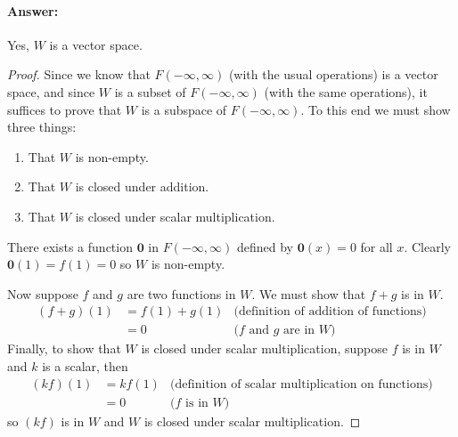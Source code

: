 \documentclass[12pt]{article}
\begin{document}
\begin{enumerate}
              \paragraph{Answer:} Yes, $W$ is a vector space.
              \begin{proof}
                      Since we know that $F(-\infty, \infty)$ (with the usual operations) is a vector space,
                      and since $W$ is a subset of $F(-\infty, \infty)$ (with the same operations),
                      it suffices to prove that $W$ is a subspace of $F(-\infty, \infty)$.
                      To this end we must show three things:
                      \begin{enumerate}
                              \item That $W$ is non-empty.
                              \item That $W$ is closed under addition.
                              \item That $W$ is closed under scalar multiplication.
                      \end{enumerate}
                      There exists a function $\mathbf{0}$ in $F(-\infty, \infty)$
                      defined by $\mathbf{0}(x)=0$ for all $x$.
                      Clearly $\mathbf{0}(1)=f(1)=0$ so $W$ is non-empty.

                      Now suppose $f$ and $g$ are two functions in $W$. We must show that $f+g$ is in $W$.
                      \begin{align*}
                              (f+g)(1) & = f(1) + g(1) & \textrm{(definition of addition of functions)} \\
                                       & = 0           & \textrm{($f$ and $g$ are in $W$)}
                      \end{align*}
                      Finally, to show that $W$ is closed under scalar multiplication,
                      suppose $f$ is in $W$ and $k$ is a scalar, then
                      \begin{align*}
                              (kf)(1) & = kf(1) & \textrm{(definition of scalar multiplication on functions)} \\
                                      & = 0     & \textrm{($f$ is in $W$)}
                      \end{align*}
                      so $(kf)$ is in $W$ and $W$ is closed under scalar multiplication.


\end{proof}
\end{enumerate}
\end{document}
